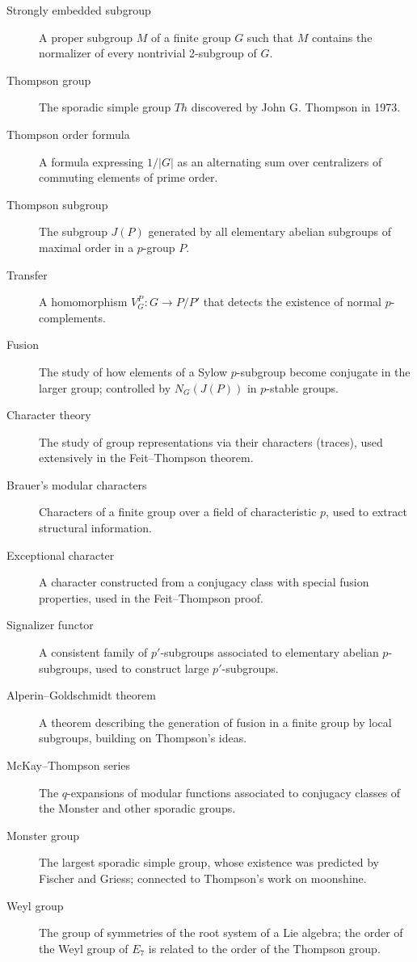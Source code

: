 \begin{description}
\item[Strongly embedded subgroup] A proper subgroup \(M\) of a finite group \(G\) such that \(M\) contains the normalizer of every nontrivial 2-subgroup of \(G\).
\item[Thompson group] The sporadic simple group \(Th\) discovered by John G. Thompson in 1973.
\item[Thompson order formula] A formula expressing \(1/|G|\) as an alternating sum over centralizers of commuting elements of prime order.
\item[Thompson subgroup] The subgroup \(J(P)\) generated by all elementary abelian subgroups of maximal order in a \(p\)-group \(P\).
\item[Transfer] A homomorphism \(V_G^P: G \to P/P'\) that detects the existence of normal \(p\)-complements.
\item[Fusion] The study of how elements of a Sylow \(p\)-subgroup become conjugate in the larger group; controlled by \(N_G(J(P))\) in \(p\)-stable groups.
\item[Character theory] The study of group representations via their characters (traces), used extensively in the Feit--Thompson theorem.
\item[Brauer's modular characters] Characters of a finite group over a field of characteristic \(p\), used to extract structural information.
\item[Exceptional character] A character constructed from a conjugacy class with special fusion properties, used in the Feit--Thompson proof.
\item[Signalizer functor] A consistent family of \(p'\)-subgroups associated to elementary abelian \(p\)-subgroups, used to construct large \(p'\)-subgroups.
\item[Alperin--Goldschmidt theorem] A theorem describing the generation of fusion in a finite group by local subgroups, building on Thompson's ideas.
\item[McKay--Thompson series] The \(q\)-expansions of modular functions associated to conjugacy classes of the Monster and other sporadic groups.
\item[Monster group] The largest sporadic simple group, whose existence was predicted by Fischer and Griess; connected to Thompson's work on moonshine.
\item[Weyl group] The group of symmetries of the root system of a Lie algebra; the order of the Weyl group of \(E_7\) is related to the order of the Thompson group.
\end{description}

